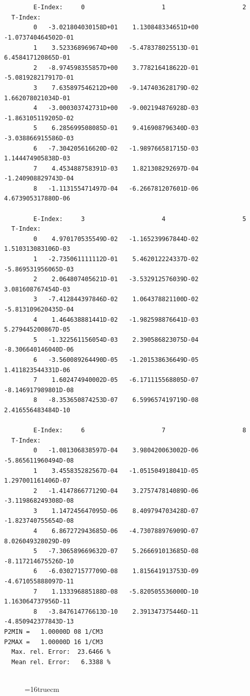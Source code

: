 \documentclass[12pt,dvipdfmx]{article}
\begin{document}
\begin{small}\begin{verbatim}


        E-Index:     0                     1                     2
  T-Index:
        0   -3.021804030158D+01    1.130848334651D+00   -1.073740464502D-01
        1    3.523368969674D+00   -5.478378025513D-01    6.458417120865D-01
        2   -8.974598355857D+00    3.778216418622D-01   -5.081928217917D-01
        3    7.635897546212D+00   -9.147403628179D-02    1.662078021034D-01
        4   -3.000303742731D+00   -9.002194876928D-03   -1.863105119205D-02
        5    6.285699508085D-01    9.416908796340D-03   -3.038866915586D-03
        6   -7.304205616620D-02   -1.989766581715D-03    1.144474905838D-03
        7    4.453488758391D-03    1.821308292697D-04   -1.240908829743D-04
        8   -1.113155471497D-04   -6.266781207601D-06    4.673905317880D-06

        E-Index:     3                     4                     5
  T-Index:
        0    4.970170535549D-02   -1.165239967844D-02    1.510313083106D-03
        1   -2.735061111112D-01    5.462012224337D-02   -5.869531956065D-03
        2    2.064807405621D-01   -3.532912576039D-02    3.081608767454D-03
        3   -7.412844397846D-02    1.064378821100D-02   -5.813109620435D-04
        4    1.464638881441D-02   -1.982598876641D-03    5.279445200867D-05
        5   -1.322561156054D-03    2.390586823075D-04   -8.306640146040D-06
        6   -3.560089264490D-05   -1.201538636649D-05    1.411823544331D-06
        7    1.602474940002D-05   -6.171115568805D-07   -8.146917989801D-08
        8   -8.353650874253D-07    6.599657419719D-08    2.416556483484D-10

        E-Index:     6                     7                     8
  T-Index:
        0   -1.081306838597D-04    3.980420063002D-06   -5.865611960494D-08
        1    3.455835282567D-04   -1.051504918041D-05    1.297001161406D-07
        2   -1.414786677129D-04    3.275747814089D-06   -3.119868249308D-08
        3    1.147245647095D-06    8.409794703428D-07   -1.823740755654D-08
        4    6.867272943685D-06   -4.730788976909D-07    8.026049328029D-09
        5   -7.306589669632D-07    5.266691013685D-08   -8.117214675526D-10
        6   -6.030271577709D-08    1.815641913753D-09   -4.671055888097D-11
        7    1.133396885188D-08   -5.820505536000D-10    1.163064737956D-11
        8   -3.847614776613D-10    2.391347375446D-11   -4.850942377843D-13
P2MIN =   1.00000D 08 1/CM3
P2MAX =   1.00000D 16 1/CM3
  Max. rel. Error:  23.6466 %
  Mean rel. Error:   6.3388 %


\end{verbatim}\end{small}
\begin{figure} \label{2.3.2b}
\epsfxsize=16truecm
\end{figure}
\newpage
\end{document}
